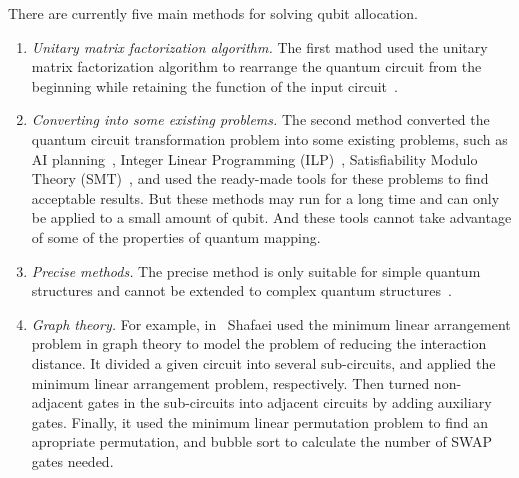 \documentclass[runningheads]{llncs}
\begin{document}
There are currently five main methods for solving qubit allocation.
\begin{enumerate}
	\item \emph{Unitary matrix factorization algorithm.} 
	The first mathod used the unitary matrix factorization algorithm to rearrange 
the quantum circuit from the beginning while retaining the function of the input 
circuit~\cite{2019CNOT,2019Quantum}.
	\item \emph{Converting into some existing problems.}  
	The second method converted the quantum circuit transformation problem into 
	some existing problems, such as AI planning~\cite{2017Temporal,2018Integer}, 
	Integer Linear Programming (ILP)~\cite{2019Almeida}, 
	Satisfiability Modulo Theory (SMT)~\cite{2019Murali},
	and used the ready-made tools for these problems to find acceptable results.
	But these methods may run for a long time and 
	can only be applied to a small amount of qubit. 
	And these tools cannot take advantage of some of the properties of quantum mapping.
	\item \emph{Precise methods.} 
	The precise method is only suitable for simple quantum structures and cannot be extended to 
	complex quantum structures~\cite{2018QubitSiraichi}.
	\item \emph{Graph theory.} 
	For example, in~\cite{Shafaei2013} Shafaei used the minimum linear arrangement problem in graph theory 
   to model the problem of reducing the interaction distance.
   It divided a given circuit into several sub-circuits, 
   and applied the minimum linear arrangement problem, respectively.
   Then turned non-adjacent gates in the sub-circuits into adjacent circuits 
   by adding auxiliary gates.
   Finally, it used the minimum linear permutation problem to find an apropriate permutation, 
   and bubble sort to calculate the number of SWAP gates needed.
   

\end{enumerate}
\end{document}

